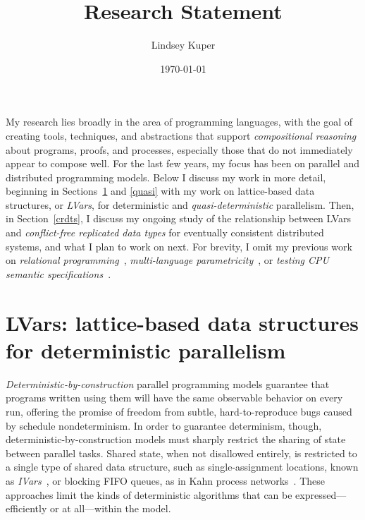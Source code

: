 \documentclass{article}
\def\name{Lindsey Kuper}
\begin{document}
\title{Research Statement}

\author{\name}

\date{\today}

\maketitle


\noindent My research lies broadly in the area of programming
languages, with the goal of creating tools, techniques, and
abstractions that support \emph{compositional reasoning} about
programs, proofs, and processes, especially those that do not
immediately appear to compose well.  For the last few years, my focus
has been on parallel and distributed programming models.  Below I
discuss my work in more detail, beginning in Sections~\ref{lvars} and
\ref{quasi} with my work on lattice-based data structures, or
\emph{LVars}, for deterministic and \emph{quasi-deterministic}
parallelism.  Then, in Section~\ref{crdts}, I discuss my ongoing study
of the relationship between LVars and \emph{conflict-free replicated
  data types} for eventually consistent distributed systems, and what
I plan to work on next.  For brevity, I omit my previous work on
\emph{relational programming}~\cite{lambdae}, \emph{multi-language
  parametricity}~\cite{multilang-talk}, or \emph{testing CPU semantic
  specifications}~\cite{tsl-tr}.

\section{LVars: lattice-based data structures for deterministic parallelism}\label{lvars}


\emph{Deterministic-by-construction} parallel programming models
guarantee that programs written using them will have the same
observable behavior on every run, offering the promise of freedom from
subtle, hard-to-reproduce bugs caused by schedule nondeterminism.  In
order to guarantee determinism, though, deterministic-by-construction
models must sharply restrict the sharing of state between parallel
tasks.  Shared state, when not disallowed entirely, is restricted to a
single type of shared data structure, such as single-assignment
locations, known as \emph{IVars}~\cite{IStructures, CnC}, or blocking
FIFO queues, as in Kahn process networks~\cite{Kahn-1974}.  These
approaches limit the kinds of deterministic algorithms that can be
expressed---efficiently or at all---within the model.
\end{document}
